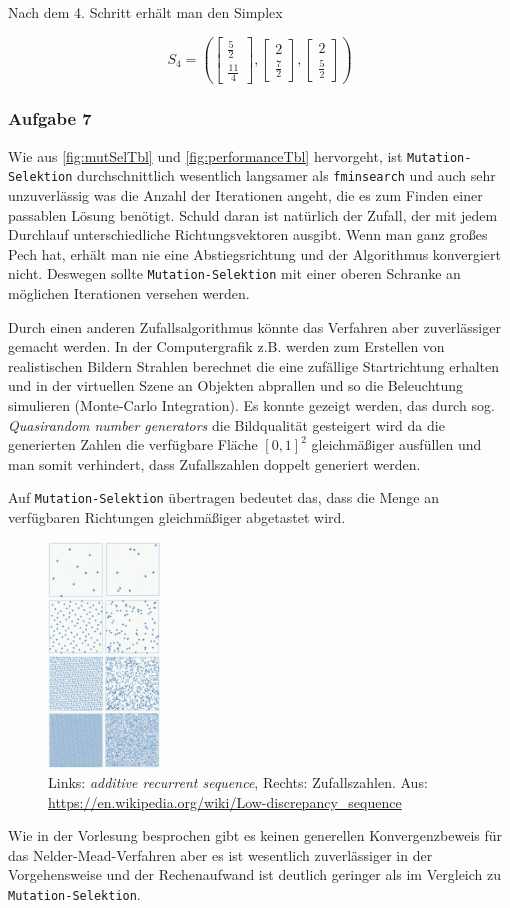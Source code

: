\documentclass[a4paper, 12pt]{report}
\begin{document}
Nach dem 4. Schritt erhält man den Simplex

$$S_4 = (\begin{bmatrix}\frac{5}{2}\\\frac{11}{4}\end{bmatrix}, \begin{bmatrix}2\\\frac{7}{2}\end{bmatrix}, \begin{bmatrix}2\\\frac{5}{2}\end{bmatrix})$$

\subsubsection{Aufgabe 7}
Wie aus \autoref{fig:mutSelTbl} und \autoref{fig:performanceTbl} hervorgeht, ist \lstinline[basicstyle=\ttfamily\color{black}]|Mutation-Selektion|
durchschnittlich wesentlich langsamer als \lstinline[basicstyle=\ttfamily\color{black}]|fminsearch| und auch sehr unzuverlässig was die Anzahl der
Iterationen angeht, die es zum Finden einer passablen Lösung benötigt. Schuld daran ist natürlich der Zufall, der mit jedem Durchlauf unterschiedliche
Richtungsvektoren ausgibt. Wenn man ganz großes Pech hat, erhält man nie eine Abstiegsrichtung und der Algorithmus konvergiert nicht. Deswegen sollte
\lstinline[basicstyle=\ttfamily\color{black}]|Mutation-Selektion| mit einer oberen Schranke an möglichen Iterationen versehen werden.\par
Durch einen anderen Zufallsalgorithmus könnte das Verfahren aber zuverlässiger gemacht werden. In der Computergrafik z.B. werden zum Erstellen von
realistischen Bildern Strahlen berechnet die eine zufällige Startrichtung erhalten und in der virtuellen Szene an Objekten abprallen und so
die Beleuchtung simulieren (Monte-Carlo Integration). Es konnte gezeigt werden, das durch sog. \textit{Quasirandom number generators}
die Bildqualität gesteigert wird da die generierten Zahlen die verfügbare Fläche $[0, 1]^2$ gleichmäßiger ausfüllen und man somit verhindert, dass
Zufallszahlen doppelt generiert werden.\par
Auf \lstinline[basicstyle=\ttfamily\color{black}]|Mutation-Selektion| übertragen bedeutet das, dass die Menge an verfügbaren Richtungen gleichmäßiger
abgetastet wird.
\begin{figure}[H]
  \centering
  \includegraphics[height=6cm]{Subrandom_2D.png}
  \caption{Links: \textit{additive recurrent sequence}, Rechts: Zufallszahlen. Aus: \protect\url{https://en.wikipedia.org/wiki/Low-discrepancy_sequence}}
\end{figure}
Wie in der Vorlesung besprochen gibt es keinen generellen Konvergenzbeweis für das Nelder-Mead-Verfahren aber es ist wesentlich zuverlässiger
in der Vorgehensweise und der Rechenaufwand ist deutlich geringer als im Vergleich zu \lstinline[basicstyle=\ttfamily\color{black}]|Mutation-Selektion|.
\end{document}
